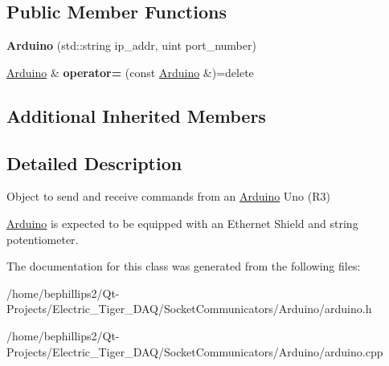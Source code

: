 \subsection*{Public Member Functions}
\begin{DoxyCompactItemize}
\item 
{\bfseries Arduino} (std\+::string ip\+\_\+addr, uint port\+\_\+number)\hypertarget{class_arduino_a92c95a8b8c1022d0145da24d53a1db7b}{}\label{class_arduino_a92c95a8b8c1022d0145da24d53a1db7b}

\item 
\hyperlink{class_arduino}{Arduino} \& {\bfseries operator=} (const \hyperlink{class_arduino}{Arduino} \&)=delete\hypertarget{class_arduino_a73d294f82c38557d1872cadd372c0b8b}{}\label{class_arduino_a73d294f82c38557d1872cadd372c0b8b}

\end{DoxyCompactItemize}
\subsection*{Additional Inherited Members}


\subsection{Detailed Description}
Object to send and receive commands from an \hyperlink{class_arduino}{Arduino} Uno (R3) 

\hyperlink{class_arduino}{Arduino} is expected to be equipped with an Ethernet Shield and string potentiometer. 

The documentation for this class was generated from the following files\+:\begin{DoxyCompactItemize}
\item 
/home/bephillips2/\+Qt-\/\+Projects/\+Electric\+\_\+\+Tiger\+\_\+\+D\+A\+Q/\+Socket\+Communicators/\+Arduino/arduino.\+h\item 
/home/bephillips2/\+Qt-\/\+Projects/\+Electric\+\_\+\+Tiger\+\_\+\+D\+A\+Q/\+Socket\+Communicators/\+Arduino/arduino.\+cpp\end{DoxyCompactItemize}
